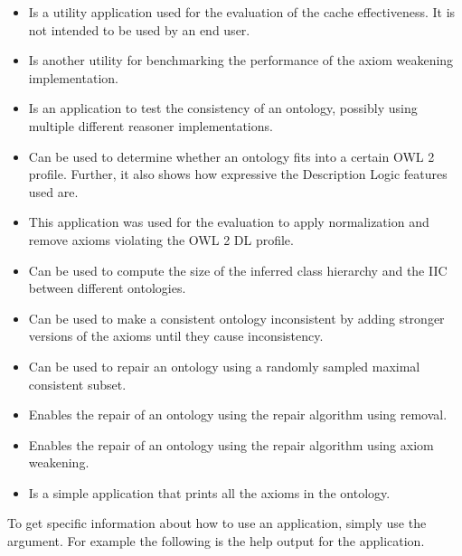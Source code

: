 \begin{itemize}
    \item {} \enspace Is a utility application used for the evaluation of the cache effectiveness. It is not intended to be used by an end user.
    \item {} \enspace Is another utility for benchmarking the performance of the axiom weakening implementation.
    \item {} \enspace Is an application to test the consistency of an ontology, possibly using multiple different reasoner implementations.
    \item {} \enspace Can be used to determine whether an ontology fits into a certain OWL 2 profile. Further, it also shows how expressive the Description Logic features used are.
    \item {} \enspace This application was used for the evaluation to apply normalization and remove axioms violating the OWL 2 DL profile.
    \item {} \enspace Can be used to compute the size of the inferred class hierarchy and the IIC between different ontologies.
    \item {} \enspace Can be used to make a consistent ontology inconsistent by adding stronger versions of the axioms until they cause inconsistency.
    \item {} \enspace Can be used to repair an ontology using a randomly sampled maximal consistent subset.
    \item {} \enspace Enables the repair of an ontology using the repair algorithm using removal.
    \item {} \enspace Enables the repair of an ontology using the repair algorithm using axiom weakening.
    \item {} \enspace Is a simple application that prints all the axioms in the ontology.
\end{itemize}

To get specific information about how to use an application, simply use the  argument. For example the following is the help output for the  application.


